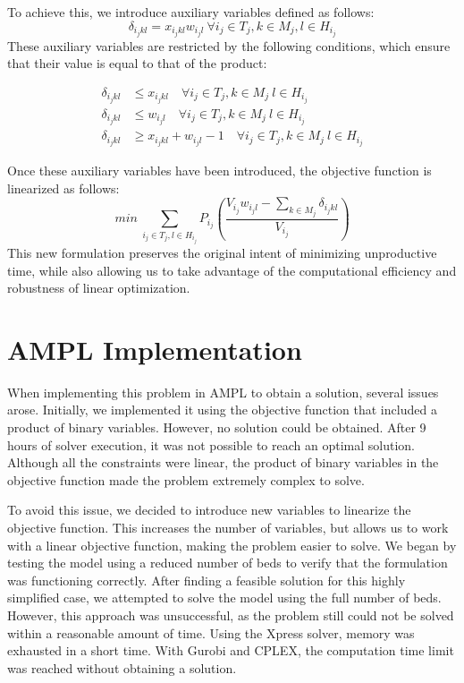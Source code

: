     To achieve this, we introduce auxiliary variables defined as follows:
    \[
        \delta_{i_j k l}=x_{i_j k l}w_{i_j l} \ \forall i_j \in T_j, k \in M_j, l \in H_{i_j}
    \]
    These auxiliary variables are restricted by the following conditions, which ensure that their value is equal to that of the product:

    \[\begin{aligned}
        \delta_{i_j k l} &\leq x_{i_j k l} \quad \forall i_j \in T_j, k \in M_j \ l\in H_{i_j}\\
        \delta_{i_j k l} &\leq w_{i_j l} \quad \forall i_j \in T_j, k \in M_j \ l\in H_{i_j}\\
	    \delta_{i_j k l} &\geq x_{i_j k l} + w_{i_j l} -1 \quad \forall i_j \in T_j, k \in M_j \ l\in H_{i_j}
    \end{aligned}\]

    Once these auxiliary variables have been introduced, the objective function is linearized as follows:
	\[
        min\ \sum_{i_j \in T_j, l\in H_{i_j}}P_{i_j}\left(\frac{V_{i_j}w_{i_j l}-\sum_{k\in M_j}\delta_{i_j k l}}{V_{i_j}}\right)
    \]
	This new formulation preserves the original intent of minimizing unproductive time,  
while also allowing us to take advantage of the computational efficiency and robustness of linear optimization.





\chapter*{AMPL Implementation} 
When implementing this problem in AMPL to obtain a solution, several issues arose. Initially, we implemented it using the objective function  
that included a product of binary variables. However, no solution could be obtained. After 9 hours of solver execution, it was not possible  
to reach an optimal solution. Although all the constraints were linear, the product of binary variables in the objective function made the problem  
extremely complex to solve.

To avoid this issue, we decided to introduce new variables to linearize the objective function.  
This increases the number of variables, but allows us to work with a linear objective function, making the problem easier to solve.  
We began by testing the model using a reduced number of beds to verify that the formulation was functioning correctly.  
After finding a feasible solution for this highly simplified case, we attempted to solve the model using the full number of beds.  
However, this approach was unsuccessful, as the problem still could not be solved within a reasonable amount of time.  
Using the Xpress solver, memory was exhausted in a short time. With Gurobi and CPLEX, the computation time limit was reached without obtaining a solution.


